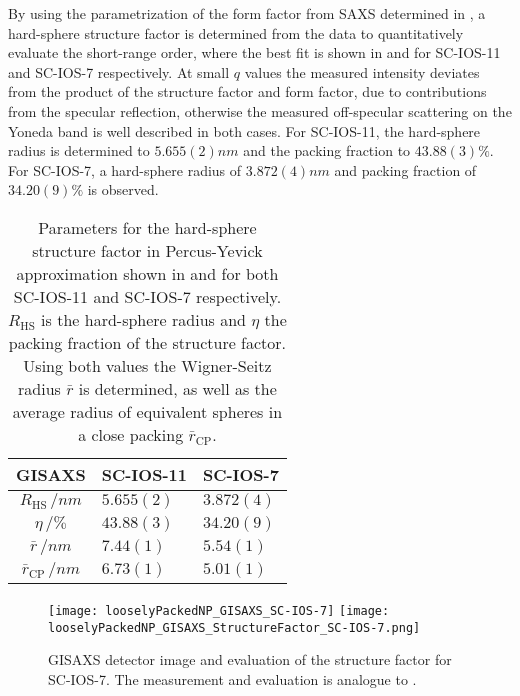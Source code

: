 \documentclass[\main/dresen_thesis.tex]{subfiles}
\begin{document}
  By using the parametrization of the form factor from SAXS determined in , a hard-sphere structure factor is determined from the data to quantitatively evaluate the short-range order, where the best fit is shown in  and  for SC-IOS-11 and SC-IOS-7 respectively.
  At small $q$ values the measured intensity deviates from the product of the structure factor and form factor, due to contributions from the specular reflection, otherwise the measured off-specular scattering on the Yoneda band is well described in both cases.
  For SC-IOS-11, the hard-sphere radius is determined to $5.655(2) \unit{nm}$ and the packing fraction to $43.88(3) \%$.
  For SC-IOS-7, a hard-sphere radius of $3.872(4) \unit{nm}$ and packing fraction of $34.20(9) \%$ is observed.
  \begin{table}[tb]
    \centering
    \caption{\label{tab:looselyPackedNP:nanoparticle:gisaxs}Parameters for the hard-sphere structure factor in Percus-Yevick approximation shown in  and  for both SC-IOS-11 and SC-IOS-7 respectively. $R_\mathrm{HS}$ is the hard-sphere radius and $\eta$ the packing fraction of the structure factor. Using both values the Wigner-Seitz radius $\bar{r}$ is determined, as well as the average radius of equivalent spheres in a close packing $\bar{r}_\mathrm{CP}$.}
    \begin{tabular}{ c | l | l }
      \rule{0pt}{2ex} \textbf{GISAXS}  & \textbf{SC-IOS-11} & \textbf{SC-IOS-7} \\
      \hline
      \rule{0pt}{2ex} $R_\mathrm{HS} \, / \unit{nm}$          & $5.655(2)$           & $3.872(4)$\\
      \rule{0pt}{2ex} $\eta          \, / \unit{\%}$          & $43.88(3)$           & $34.20(9)$\\
      \hline
      \rule{0pt}{2ex} $\bar{r}       \, / \unit{nm}$          & $7.44(1)$            & $5.54(1)$\\
      \hline
      \rule{0pt}{2ex} $\bar{r}_\mathrm{CP} \, / \unit{nm}$    & $6.73(1)$            & $5.01(1)$\\
      \hline
    \end{tabular}
  \end{table}
  \begin{figure}[tb]
    \centering
    \texttt{[image: looselyPackedNP\_GISAXS\_SC-IOS-7]}
    \texttt{[image: looselyPackedNP\_GISAXS\_StructureFactor\_SC-IOS-7.png]}
    \caption{\label{fig:looselyPackedNP:layer:gisaxsSC_IOS_7}GISAXS detector image and evaluation of the structure factor for SC-IOS-7. The measurement and evaluation is analogue to .}
  \end{figure}
\end{document}
